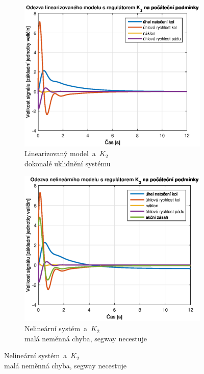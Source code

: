 \documentclass[conference]{IEEEtran}
\begin{document}
\begin{figure}[h!]
    \centering %
    \begin{subfigure}{0.45\textwidth} 
        \centerline{\includegraphics[width=\linewidth]{stavova_K2_lin.eps}}
        \caption{Linearizovaný model~a~$K_2$ \\ dokonalé uklidnění systému}
        \label{fig:stavova_K2_lin}        
    \end{subfigure}\hfil
    \centering %
    \begin{subfigure}{0.45\textwidth}
        \centerline{\includegraphics[width=\linewidth]{stavova_K2_nelin.eps}}
        \caption{Nelineární systém~a~$K_2$ \\ malá neměnná chyba, segway necestuje}
        \label{fig:stavova_K2_nelin}        
    \end{subfigure}\hfil
    

\end{figure}
\end{document}
